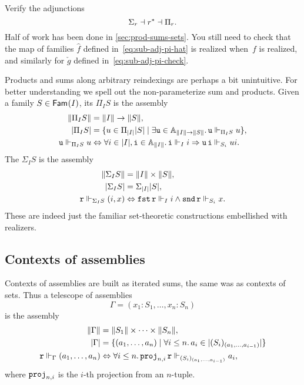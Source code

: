 \begin{exercise}
  Verify the adjunctions
  \begin{equation*}
    \Sigma_r \dashv \invim{r} \dashv \Pi_r.
  \end{equation*}
  Half of work has been done in \cref{sec:prod-sums-sets}.
  You still need to check that the map of families $\hat{f}$ defined in~\eqref{eq:sub-adj-pi-hat} is realized when~$f$ is realized, and similarly for $\check{g}$ defined in~\eqref{eq:sub-adj-pi-check}.
\end{exercise}

Products and sums along arbitrary reindexings are perhaps a bit unintuitive. For better understanding we spell out the non-parameterize sum and products.
%
Given a family $S \in \Fam{I}$, its  $\Pi_I S$ is the assembly
%
\begin{align*}
  \T{\Pi_I S} &= \T{I} \to \T{S}, \\
  \S{\Pi_I S} &= \textstyle
     \set{u \in \Pi_{\S{I}} \S{S} \such
          \some{\R{u} \in \Atyp{\T{I} \to \T{S}}} \R{u} \rz[\Pi_I S] u
     },\\
  \R{u} \rz[\Pi_I S] u &\liff
  \all{i \in \S{I}, \R{i} \in \Atyp{\T{I}}}
    \R{i} \rz[I] i \lthen \R{u}\,\R{i} \rz[S_i] u i.
\end{align*}
%
The  $\Sigma_I S$ is the assembly
%
\begin{align*}
  \T{\Sigma_I S} &= \T{I} \times \T{S}, \\
  \S{\Sigma_I S} &= \Sigma_{\S{I}} \S{S}, \\
  \R{r} \rz[\Sigma_I S] (i, x) &\liff
    \combFst\,\R{r} \rz[I] i \land
    \combSnd\,\R{r} \rz[S_i] x.
\end{align*}
%
These are indeed just the familiar set-theoretic constructions embellished with realizers.

\subsection{Contexts of assemblies}
\label{sec:contexts-assemblies}

Contexts of assemblies are built as iterated sums, the same was as contexts of sets.
Thus a telescope of assemblies
%
\begin{equation*}
  \Gamma = (x_1 : S_1, \ldots, x_n : S_n)
\end{equation*}
%
is the assembly
%
\begin{align*}
  \T{\Gamma} &= \T{S_1} \times \cdots \times \T{S_n}, \\
  \S{\Gamma} &= \set{(a_1, \ldots, a_n) \such \all{i \leq n} a_i \in \S{(S_i)_{(a_1, \ldots, a_{i-1})}}} \\
  \R{r} \rz[\Gamma] (a_1, \ldots, a_n)
  &\liff
  \all{i \leq n} \pcacomb{proj}_{n,i}\,\R{r} \rz[(S_i)_{(a_1, \ldots, a_{i-1})}] a_i,
\end{align*}
%
where $\pcacomb{proj}_{n,i}$ is the $i$-th projection from an $n$-tuple.

